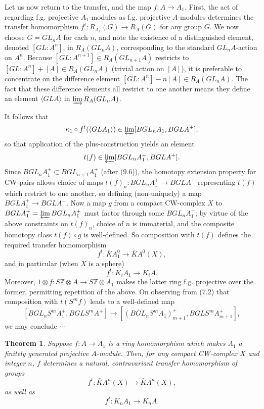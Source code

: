 \documentclass[openany,leqno]{book}  %
\newcommand{\Z}{\mathbb{Z}}
\newtheorem{theorem}{Theorem}[chapter]
\begin{document}
Let us now return to the transfer, and the map $f\colon   A \longrightarrow A_1$. First, the act of regarding f.g. projective $A_1$-modules as f.g. projective $A$-modules determines the transfer homomorphism $f^t \colon   R_{A_1} (G) \longrightarrow R_A(G)$ for any group $G$. We now choose $G = GL_nA$ for each $n$, and note the existence of a distinguished element, denoted $[GL:A^n]$, in $R_A(GL_nA)$, corresponding to the standard $GL_nA$-action on $A^n$. Because $[GL:A^{n+1} ]\in R_A(GL_{n+1} A)$ restricts to $[GL:A^n] + [A] \in R_A(GL_nA)$ (trivial action on $[A]$), it is preferable to concentrate on the difference element $[GL:A^n ] - n[A] \in R_A(GL_nA)$. The fact that these difference elements all restrict to one another means they define an element $\langle GLA\rangle$ in $\varinjlim R_A(GL_nA)$.

It follows that
\[\kappa_1\circ f^t(\langle GLA_1\rangle) \in \varprojlim [BGL_nA_1,BGLA^+], \]
so that application of the plus-construction yields an element 
\[t(f)\in\varprojlim[BGL_nA_1^+,BGLA^+] .\]
Since $BGL_nA_1^+ \subset BGL_{n+1} A_1^+$ (after (9.6)), the homotopy extension property for CW-pairs allows choice of maps $t(f)_n \colon  BGL_nA_1^+ \longrightarrow BGLA^+$ representing $t(f)$ which restrict to one another, so defining (non-uniquely) a map $BGLA_1^+ \longrightarrow BGLA^+$. Now a map $g$ from a compact CW-complex $X$ to $BGLA_1^+ = \varprojlim BGL_nA_1^+$ must factor through some $BGL_nA_1^+$; by virtue of the above constraints on $t(f)_n$, choice of $n$ is immaterial, and the composite homotopy class $t(f) \circ g$ is well-defined. So composition with $t(f)$ defines the required transfer homomorphism
\[f^t\colon \bar{K}A_1^0 \longrightarrow \bar{K}A^0(X),\]
and in particular (when $X$ is a sphere)
\[f^t\colon K_iA_1 \longrightarrow K_iA .\]
Moreover, $1 \otimes f\colon S\Z\otimes A\longrightarrow S\Z\otimes A_1$ makes the latter ring f.g. projective over the former, permitting repetition of the above. On observing from (7.2) that composition with $t(S^mf)$ leads to a well-defined map
\[[BGL_nS^mA_1^+,BGLS^mA^+]\longrightarrow [(BGL_nS^mA_1)_{m+1}^+,BGLS^mA_{m+1}^+], \]
we may conclude $\cdots $
\begin{theorem}
Suppose $f\colon  A \longrightarrow A_1$ is a ring homomorphism which makes $A_1$ a finitely generated projective $A$-module. Then, for any compact CW-complex $X$ and integer $n$, $f$ determines a natural, contravariant transfer homomorphism of groups
\[f^t\colon \bar{K}A_1^n(X)\longrightarrow \bar{K}A^n(X),\]
as well as
\[f^t\colon K_nA_1\longrightarrow K_nA.\]
\end{theorem}
\end{document}
